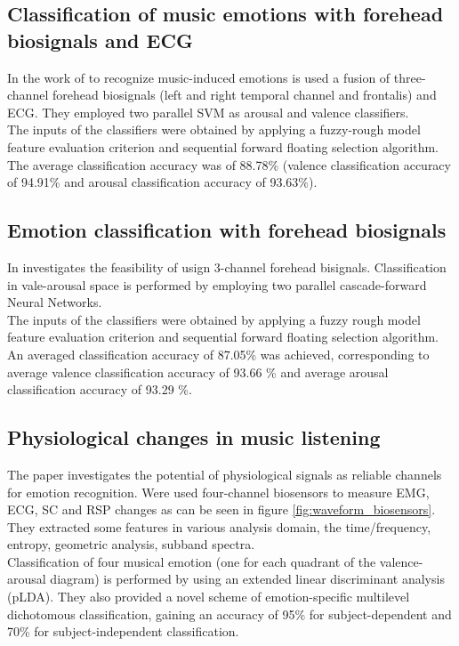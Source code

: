 \subsection{Classification of music emotions with  forehead biosignals and ECG}
In the work of \cite{naji2014classification} to recognize music-induced emotions is used a fusion of three-channel forehead biosignals (left and right temporal channel and frontalis) and ECG. They employed two parallel SVM as arousal and valence classifiers.
\\ \indent
The inputs of the classifiers were obtained by applying a fuzzy-rough model feature evaluation criterion and sequential forward floating selection algorithm.
\\
The average classification accuracy was of 88.78\% (valence classification accuracy of 94.91\% and arousal classification accuracy of 93.63\%).

\subsection{Emotion classification with forehead biosignals}
In \cite{naji2015emotion} investigates the feasibility of usign 3-channel forehead bisignals. Classification in vale-arousal space is performed by employing two parallel cascade-forward Neural Networks.
\\
The inputs of the classifiers were obtained by applying a fuzzy rough model feature evaluation criterion and sequential forward floating selection algorithm. An averaged classification accuracy of 87.05\% was achieved, corresponding to average valence classification accuracy of 93.66 \% and average arousal classification accuracy of 93.29 \%.

\subsection{Physiological changes in music listening}
The paper \cite{kim2008emotion} investigates the potential of physiological signals as reliable channels for emotion recognition. Were used four-channel biosensors to measure EMG, ECG, SC and RSP changes as can be seen in figure \ref{fig:waveform_biosensors}. They extracted some features in various analysis domain, the time/frequency, entropy, geometric analysis, subband spectra.
\\ \indent
Classification of four musical emotion (one for each quadrant of the valence-arousal diagram) is performed by using an extended linear discriminant analysis (pLDA). They also provided a novel scheme of emotion-specific multilevel dichotomous classification, gaining an accuracy of 95\% for subject-dependent and 70\% for subject-independent classification.
 
